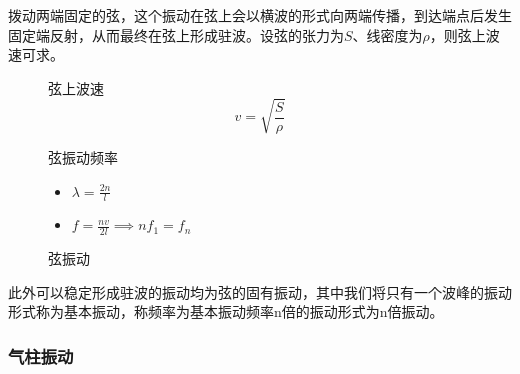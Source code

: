 拨动两端固定的弦，这个振动在弦上会以横波的形式向两端传播，到达端点后发生固定端反射，从而最终在弦上形成驻波。设弦的张力为$S$、线密度为$\rho$，则弦上波速可求。
\begin{figure}[ht!]
    \centering
    \begin{minipage}{0.48\textwidth}
        \begin{itembox}[l]{弦上波速}
            \begin{equation*}
                v=\sqrt{\frac{S}{\rho}}
            \end{equation*}
        \end{itembox}
        \begin{itembox}[l]{弦振动频率}
            \begin{itemize}
                \item $\lambda=\frac{2n}{l}$
                \item $f=\frac{nv}{2l}\implies nf_1=f_n$
            \end{itemize}
        \end{itembox}
    \end{minipage}
    \begin{minipage}{0.48\textwidth}
        \centering
        \caption{弦振动}
    \end{minipage}
\end{figure}
此外可以稳定形成驻波的振动均为弦的固有振动，其中我们将只有一个波峰的振动形式称为基本振动，称频率为基本振动频率n倍的振动形式为n倍振动。

\subsubsection{气柱振动}

